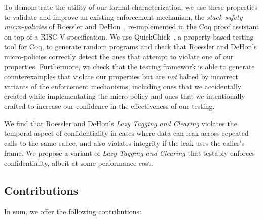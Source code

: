 To demonstrate the utility of our formal characterization, we use these
properties to validate and improve an existing enforcement mechanism, the
{\em stack safety micro-policies} of Roessler and DeHon~\cite{DBLP:conf/sp/RoesslerD18}, re-implemented
in the Coq proof assistant on top of a  RISC-V specification.  We
use QuickChick~\cite{Denes:VSL2014,Pierce:SF4}, a property-based testing
tool for Coq, to generate random programs and check
that Roessler and DeHon's micro-policies correctly detect the ones that
attempt to violate one of our properties. Furthermore, we
check that the testing framework is able to generate counterexamples
that violate our properties but are \emph{not} halted by incorrect
variants of the enforcement mechanisms, including ones that we accidentally created
while implementating the micro-policy and ones that we
intentionally crafted to increase our confidence in the effectiveness
of our testing.
%

We find that Roessler and DeHon's \emph{Lazy Tagging and Clearing}
violates the temporal aspect of confidentiality in
cases where data can leak across repeated calls to the same callee,
and also violates integrity if the leak uses the caller's frame. We
propose a variant of {\em Lazy Tagging and Clearing} that testably enforces
confidentiality, albeit at some performance cost.
%

\subsection{Contributions}

In sum, we offer the following contributions:

